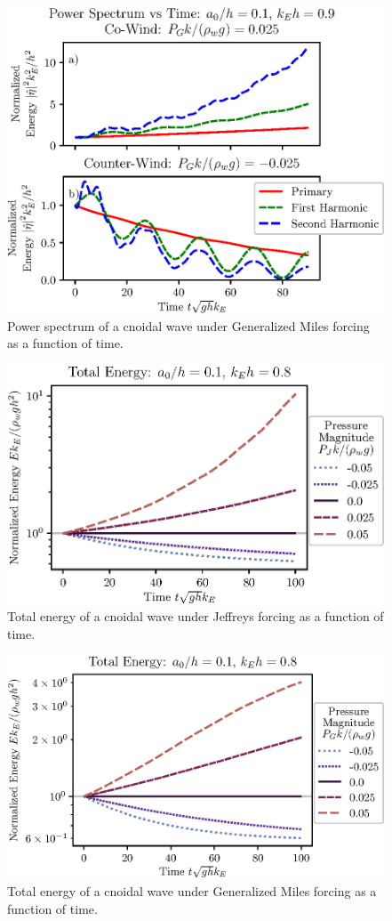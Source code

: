 \documentclass{jfm}
\begin{document}
\begin{figure}
  \centering
  \includegraphics{Power-Spectrum-vs-Time-GM.eps}
  \caption{
    Power spectrum of a cnoidal wave under Generalized Miles forcing as a
    function of time.
  }
\end{figure}

\begin{figure}
  \centering
  \includegraphics{Total-Energy-Jeffreys.eps}
  \caption{
    Total energy of a cnoidal wave under Jeffreys forcing as a function
    of time.
  }
\end{figure}

\begin{figure}
  \centering
  \includegraphics{Total-Energy-GM.eps}
  \caption{
    Total energy of a cnoidal wave under Generalized Miles forcing as a
    function of time.
  }
\end{figure}
\end{document}
